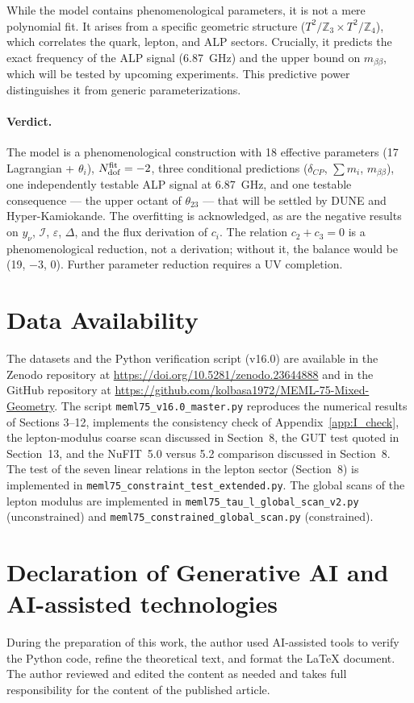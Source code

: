 \documentclass[12pt,a4paper]{article}
\numberwithin{equation}{section}
\begin{document}
While the model contains phenomenological parameters, it is not a mere polynomial fit. It arises from a specific geometric structure (\(T^2/\mathbb{Z}_3 \times T^2/\mathbb{Z}_4\)), which correlates the quark, lepton, and ALP sectors. Crucially, it predicts the exact frequency of the ALP signal (6.87~GHz) and the upper bound on \(m_{\beta\beta}\), which will be tested by upcoming experiments. This predictive power distinguishes it from generic parameterizations.

\paragraph{Verdict.} The model is a phenomenological construction with 18 effective parameters (17 Lagrangian + \(\theta_i\)), \(N_{\rm dof}^{\rm fit} = -2\), three conditional predictions (\(\delta_{CP}\), \(\sum m_i\), \(m_{\beta\beta}\)), one independently testable ALP signal at 6.87~GHz, and one testable consequence --- the upper octant of \(\theta_{23}\) --- that will be settled by DUNE and Hyper-Kamiokande. The overfitting is acknowledged, as are the negative results on \(y_\nu\), \(\mathcal I\), \(\varepsilon\), \(\Delta\), and the flux derivation of \(c_i\). The relation \(c_2 + c_3 = 0\) is a phenomenological reduction, not a derivation; without it, the balance would be (19, \(-3\), \(0\)). Further parameter reduction requires a UV completion.

\section*{Data Availability}
The datasets and the Python verification script (v16.0) are available in the Zenodo repository at \url{https://doi.org/10.5281/zenodo.23644888} and in the GitHub repository at \url{https://github.com/kolbasa1972/MEML-75-Mixed-Geometry}. The script \texttt{meml75\_v16.0\_master.py} reproduces the numerical results of Sections 3--12, implements the consistency check of Appendix~\ref{app:I_check}, the lepton-modulus coarse scan discussed in Section~8, the GUT test quoted in Section~13, and the NuFIT~5.0 versus 5.2 comparison discussed in Section~8. The test of the seven linear relations in the lepton sector (Section~8) is implemented in \texttt{meml75\_constraint\_test\_extended.py}. The global scans of the lepton modulus are implemented in \texttt{meml75\_tau\_l\_global\_scan\_v2.py} (unconstrained) and \texttt{meml75\_constrained\_global\_scan.py} (constrained).

\section*{Declaration of Generative AI and AI-assisted technologies}
During the preparation of this work, the author used AI-assisted tools to verify the Python code, refine the theoretical text, and format the LaTeX document. The author reviewed and edited the content as needed and takes full responsibility for the content of the published article.
\end{document}
